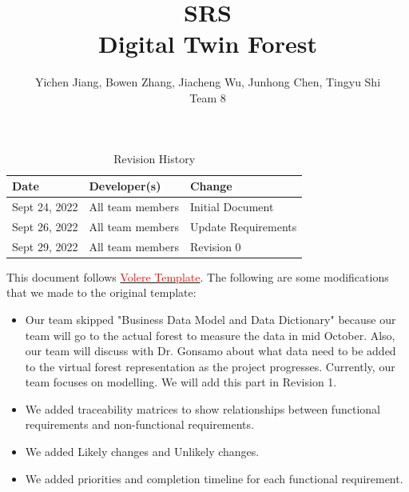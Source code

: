 \documentclass{article}
\title{SRS\\Digital Twin Forest}
\author{Yichen Jiang, Bowen Zhang, Jiacheng Wu, Junhong Chen, Tingyu Shi\\Team 8}
\begin{document}
\maketitle
\newpage
\begin{table}[htp]
\caption{Revision History} 
\begin{tabularx}{\textwidth}{llX}
\toprule
\textbf{Date} & \textbf{Developer(s)} & \textbf{Change}\\
\midrule
Sept 24, 2022 & All team members & Initial Document\\
Sept 26, 2022 & All team members & Update Requirements\\
Sept 29, 2022 & All team members & Revision 0\\

\bottomrule
\end{tabularx}
\end{table}

\vspace{5cm}

\noindent This document follows \href{https://www.cs.uic.edu/~i440/VolereMaterials/templateArchive16/c\%20Volere\%20template16.pdf}{\textcolor{red}{Volere Template}}.
The following are some modifications that we made to the 
original template:
\begin{itemize}
    \item Our team skipped "Business Data Model and Data Dictionary" because 
    our team will go to the actual forest to measure the data in mid October.
    Also, our team will discuss with Dr. Gonsamo about what data need to be
    added to the virtual forest representation as the project progresses.
    Currently, our team focuses on modelling. We will add this part in Revision
    1.
    \item We added traceability matrices to show relationships between
    functional requirements and non-functional requirements.
    \item We added Likely changes and Unlikely changes.
    \item We added priorities and 
    completion timeline for each functional requirement.
\end{itemize}


\newpage
\end{document}
